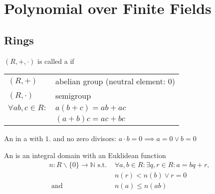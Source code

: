 

\section{Polynomial over Finite Fields}

\subsection{Rings}
\begin{definition}
$(R,+,\cdot)$ is called a  if
\begin{tabular}{ll}
  $(R,+)$ & abelian group (neutral element: 0)\\
  $(R,\cdot)$ & semigroup \\
  $\forall ab,c \in R:$ & $a(b+c) = ab+ac$\\
                        & $(a+b)c = ac+bc$\\
\end{tabular}
\end{definition}

\begin{definition}
An  in a  with $1$.
and no zero divisors: $a\cdot b = 0 \implies a=0 \lor b = 0$
\end{definition}

\begin{definition}
An  is an integral domain with an Euklidean function
\begin{align*}
  n: R \backslash \{0\} \rightarrow \mathbb{N} \text{ s.t. } &\forall a,b \in R: \exists q,r \in R: a = bq + r, \\
  &n(r) < n(b) \lor r=0 \\
  \text{ and } &n(a) \leq n(ab)
\end{align*}
\end{definition}

